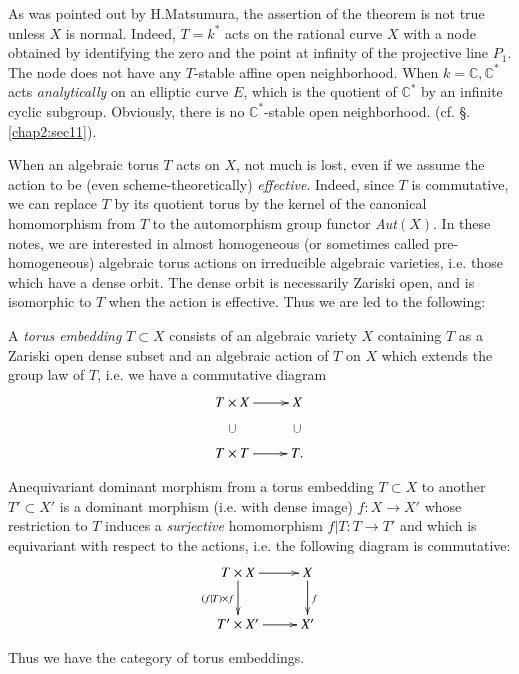 \begin{remark*}
As was pointed out by H.Matsumura, the assertion of the theorem is not
true unless $X$ is normal. Indeed, $T = k^*$ acts on the rational
curve $X$ with a node obtained by identifying the zero and the point
at infinity of the projective line $P_1$. The node does not have any
$T$-stable affine open neighborhood. When $k = \mathbb{C},
\mathbb{C}^*$ acts {\em{analytically}} on an elliptic curve $E$,
which is the quotient of $\mathbb{C}^*$ by an infinite cyclic
subgroup. Obviously, there is no $\mathbb{C}^*$-stable open
neighborhood. (cf. \S. \ref{chap2:sec11}). 
\end{remark*}

When an algebraic torus $T$ acts on $X$, not much is lost, even if we
assume the action to be (even scheme-theoretically)
\textit{effective}. Indeed, since $T$ is commutative, we can replace
$T$ by its quotient torus by the kernel of the canonical homomorphism
from $T$ to the automorphism group functor \textit{Aut$(X)$}. In these
notes, we are interested in almost homogeneous (or sometimes called
pre-homogeneous) algebraic torus actions on irreducible algebraic
varieties, i.e. those which have a dense orbit. The dense orbit is
necessarily Zariski open, and is isomorphic to $T$ when the action is
effective. Thus we are led to the following: 

\begin{defi*}
A \textit{torus embedding} $T \subset X$ consists of an algebraic
variety $X$ containing $T$ as a Zariski open dense subset and an
algebraic action of $T$ on $X$ which extends the group law of $T$,
i.e. we have a commutative diagram 
\[
\xymatrix{
T \times X \ar[r] \ar@{}[d]|{\bigcup} & X \ar@{}[d]|{\bigcup}\\ 
T \times T \ar[r] & T.
}
\]

\end{defi*}

\noindent
An\pageoriginale equivariant dominant morphism from a torus embedding
$T \subset X$ to another $T' \subset X'$ is a dominant morphism
(i.e. with dense image) $f : X \rightarrow X'$ whose restriction to
$T$ induces a \textit{surjective} homomorphism $f|T : T \rightarrow
T'$ and which is equivariant with respect to the actions, i.e. the
following diagram is commutative:   
\[
\xymatrix{
T \times X \ar[r] \ar[d]_{(f|T) \times f} & X \ar[d]^f\\
T' \times X' \ar[r] & X'
}
\]

\noindent
Thus we have the category of torus embeddings.


